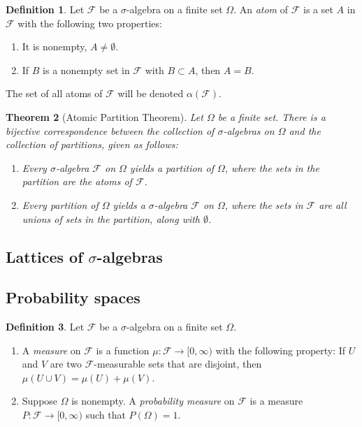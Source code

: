 \documentclass[11pt]{book}
\newtheorem{thm}{Theorem}[section]
\theoremstyle{definition}
\newtheorem{defn}[thm]{Definition}
\numberwithin{equation}{section}
\begin{document}
\begin{defn}
	Let $\mathcal{F}$ be a $\sigma$-algebra on a finite set $\Omega$. An \textit{atom} of $\mathcal{F}$ is a set $A$ in $\mathcal{F}$ with the following two properties:
	\begin{enumerate}
		\item It is nonempty, $A\neq \emptyset$.
		\item If $B$ is a nonempty set in $\mathcal{F}$ with $B\subset A$, then $A=B$.
	\end{enumerate}
	The set of all atoms of $\mathcal{F}$ will be denoted $\alpha(\mathcal{F})$.
\end{defn}

\begin{thm}[Atomic Partition Theorem]
	Let $\Omega$ be a finite set. There is a bijective correspondence between the collection of $\sigma$-algebras on $\Omega$ and the collection of partitions, given as follows:
	\begin{enumerate}
		\item Every $\sigma$-algebra $\mathcal{F}$ on $\Omega$ yields a partition of $\Omega$, where the sets in the partition are the atoms of $\mathcal{F}$.
		\item Every partition of $\Omega$ yields a $\sigma$-algebra $\mathcal{F}$ on $\Omega$, where the sets in $\mathcal{F}$ are all unions of sets in the partition, along with $\emptyset$.
	\end{enumerate}
\end{thm}

\subsection{\texorpdfstring{Lattices of $\sigma$-algebras}{Lattices of sigma-algebras}}

\subsection{Probability spaces}

\begin{defn}
	Let $\mathcal{F}$ be a $\sigma$-algebra on a finite set $\Omega$.
	\begin{enumerate}
		\item A \textit{measure} on $\mathcal{F}$ is a function $\mu:\mathcal{F} \to [0,\infty)$ with the following property: If $U$ and $V$ are two $\mathcal{F}$-measurable sets that are disjoint, then $\mu(U\cup V) = \mu(U) + \mu(V)$.
		\item Suppose $\Omega$ is nonempty. A \textit{probability measure} on $\mathcal{F}$ is a measure $P: \mathcal{F} \to [0,\infty)$ such that $P(\Omega)=1$.
	\end{enumerate}
\end{defn}
\end{document}
